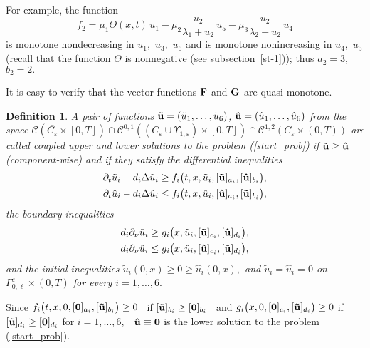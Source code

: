 \documentclass[reqno]{amsart}            %
\newtheorem{definition}{Definition}[section]
\numberwithin{equation}{section}
\begin{document}
For example,  the function
$$
f_2= \mu_1 \Theta(x,t)\, u_1 - \mu_2 \frac{ u_2}{\lambda_1 + u_2} \, u_5 -  \mu_3 \frac{u_2}{\lambda_2 + u_2} \, u_4
$$
is monotone nondecreasing in $u_1,$ $u_3,$ $u_6$ and is
monotone nonincreasing in $u_4,$ $u_5$ (recall that the function $\Theta$ is nonnegative (see subsection~\ref{st-1})); thus
$a_2=3,$ $b_2=2.$


It is easy to verify that the vector-functions ${\bf F}$ and ${\bf G}$ are quasi-monotone.

\begin{definition}
A pair of functions ${\bf{\tilde u}}=(\tilde{u}_1,\ldots,\tilde{u}_6)$, ${\bf{\hat u}}=(\hat{u}_1,\ldots,\hat{u}_6)$
from the space
$\mathcal{C}(\overline{C_\varepsilon}\times[0,T]) \cap \mathcal{C}^{0,1}((C_\varepsilon \cup \Upsilon_{1,\varepsilon})\times[0,T]) \cap \mathcal{C}^{1,2}(C_\varepsilon\times(0,T))$ are called coupled
upper and lower solutions to the problem (\ref{start_prob}) if
${\bf \tilde u} \ge {\bf \hat u}$
(component-wise) and if they satisfy the differential inequalities
\begin{gather*}
\partial_t \tilde{u}_i - d_i \Delta \tilde{u}_i \ge f_i\big(t,x,\tilde{u}_i, [{\bf\tilde{u}}]_{a_i}, [{\bf\hat{u}}]_{b_i}\big),
\\
\partial_t \hat{u}_i - d_i \Delta \hat{u}_i \le f_i\big(t,x,\hat{u}_i, [{\bf\hat{u}}]_{a_i}, [{\bf\tilde{u}}]_{b_i}\big),
\end{gather*}
the boundary inequalities
\begin{gather*}
 d_i \partial_{\nu} \tilde{u}_i \ge g_i\big(x,\tilde{u}_i, [{\bf\tilde{u}}]_{c_i}, [{\bf\hat{u}}]_{d_i}\big),
\\
 d_i \partial_{\nu} \hat{u}_i \le g_i\big(x,\hat{u}_i, [{\bf\hat{u}}]_{c_i}, [{\bf\tilde{u}}]_{d_i}\big),
\end{gather*}
and the initial inequalities $\tilde{u}_i(0,x) \ge  0 \ge \hat{u}_i(0,x),$ and
$\tilde{u}_i = \hat{u}_i = 0$ on $\Gamma^\varepsilon_{0,\ell}\times(0,T)$ for every $i=1,\ldots,6.$
\end{definition}

Since  $f_i\big(t,x, 0, [{\bf 0}]_{a_i}, [{\bf\tilde{u}}]_{b_i}\big) \ge 0$ \ if $[{\bf\tilde{u}}]_{b_i}\ge [{\bf 0}]_{b_i}$ \ and
$g_i\big(x, 0, [{\bf 0}]_{c_i}, [{\bf\tilde{u}}]_{d_i}\big) \ge  0$ if $[{\bf\tilde{u}}]_{d_i}\ge [{\bf 0}]_{d_i}$ for $i=1,\ldots,6,$
\ ${\bf \hat u}\equiv \bf{0}$ is the lower solution to the problem (\ref{start_prob}).
\end{document}
